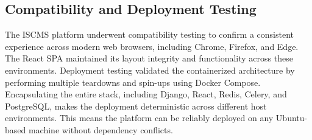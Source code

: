 \begin{table}[H]
    \centering
    \caption{NFR-TC-04: Cognitive Load and Interface Usability}
    \label{tab:nfr_tc_04}
    \renewcommand{\arraystretch}{1.4}
\end{table}

\subsection{Compatibility and Deployment Testing}
The ISCMS platform underwent compatibility testing to confirm a consistent experience across modern web browsers, including Chrome, Firefox, and Edge. The React SPA maintained its layout integrity and functionality across these environments. Deployment testing validated the containerized architecture by performing multiple teardowns and spin-ups using Docker Compose. Encapsulating the entire stack, including Django, React, Redis, Celery, and PostgreSQL, makes the deployment deterministic across different host environments. This means the platform can be reliably deployed on any Ubuntu-based machine without dependency conflicts.

